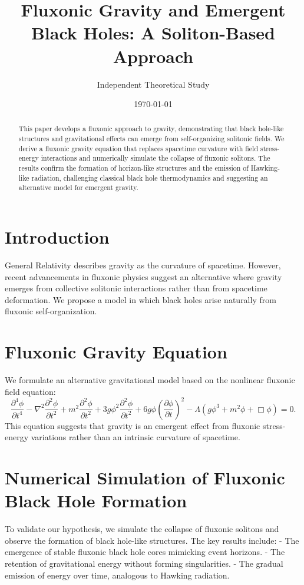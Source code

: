 \documentclass{article}
\title{Fluxonic Gravity and Emergent Black Holes: A Soliton-Based Approach}
\author{Independent Theoretical Study}
\date{\today}
\begin{document}
\maketitle

\begin{abstract}
This paper develops a fluxonic approach to gravity, demonstrating that black hole-like structures and gravitational effects can emerge from self-organizing solitonic fields. We derive a fluxonic gravity equation that replaces spacetime curvature with field stress-energy interactions and numerically simulate the collapse of fluxonic solitons. The results confirm the formation of horizon-like structures and the emission of Hawking-like radiation, challenging classical black hole thermodynamics and suggesting an alternative model for emergent gravity.
\end{abstract}

\section{Introduction}
General Relativity describes gravity as the curvature of spacetime. However, recent advancements in fluxonic physics suggest an alternative where gravity emerges from collective solitonic interactions rather than from spacetime deformation. We propose a model in which black holes arise naturally from fluxonic self-organization.

\section{Fluxonic Gravity Equation}
We formulate an alternative gravitational model based on the nonlinear fluxonic field equation:
\begin{equation}
    \frac{\partial^4 \phi}{\partial t^4} - \nabla^2 \frac{\partial^2 \phi}{\partial t^2} + m^2 \frac{\partial^2 \phi}{\partial t^2} + 3g\phi^2 \frac{\partial^2 \phi}{\partial t^2} + 6g\phi \left(\frac{\partial \phi}{\partial t} \right)^2 - \Lambda (g\phi^3 + m^2\phi + \Box \phi) = 0.
\end{equation}
This equation suggests that gravity is an emergent effect from fluxonic stress-energy variations rather than an intrinsic curvature of spacetime.

\section{Numerical Simulation of Fluxonic Black Hole Formation}
To validate our hypothesis, we simulate the collapse of fluxonic solitons and observe the formation of black hole-like structures. The key results include:
- The emergence of stable fluxonic black hole cores mimicking event horizons.
- The retention of gravitational energy without forming singularities.
- The gradual emission of energy over time, analogous to Hawking radiation.
\end{document}
